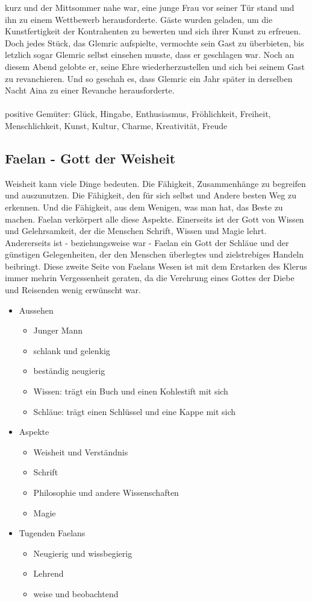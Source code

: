 kurz und der Mittsommer nahe war, eine junge Frau vor seiner Tür stand und ihn zu einem Wettbewerb herausforderte. Gäste wurden geladen, um die Kunstfertigkeit der Kontrahenten 
zu bewerten und sich ihrer Kunst zu erfreuen. Doch jedes Stück, das Glemric aufspielte, vermochte sein Gast zu überbieten, bis letzlich sogar Glemric selbst einsehen musste, 
dass er geschlagen war. Noch an diesem Abend gelobte er, seine Ehre wiederherzustellen und sich bei seinem Gast zu revanchieren. Und so geschah es, dass Glemric ein Jahr später 
in derselben Nacht Aina zu einer Revanche herausforderte. \\~\\
positive Gemüter: Glück, Hingabe, Enthusiasmus, Fröhlichkeit, Freiheit, Menschlichkeit, Kunst, Kultur, Charme, Kreativität, Freude

\subsection{\textbf{Faelan} - Gott der Weisheit}
Weisheit kann viele Dinge bedeuten. Die Fähigkeit, Zusammenhänge zu begreifen und auszunutzen. Die Fähigkeit, den für sich selbst und Andere besten Weg zu erkennen. Und die 
Fähigkeit, aus dem Wenigen, was man hat, das Beste zu machen. Faelan verkörpert alle diese Aspekte. Einerseits ist der Gott von Wissen und 
Gelehrsamkeit, der die Menschen Schrift, Wissen und Magie lehrt. Andererseits ist - beziehungsweise war - Faelan ein Gott der Schläue und 
der günstigen Gelegenheiten, der den Menschen überlegtes und zielstrebiges Handeln beibringt. Diese zweite Seite von Faelans Wesen ist mit 
dem Erstarken des Klerus immer mehrin Vergessenheit geraten, da die Verehrung eines Gottes der Diebe und Reisenden wenig erwünscht war.\\
\begin{itemize}
	\item Aussehen 
	\begin{itemize}
		\item Junger Mann 
		\item schlank und gelenkig
		\item beständig neugierig
		\item Wissen: trägt ein Buch und einen Kohlestift mit sich
		\item Schläue: trägt einen Schlüssel und eine Kappe mit sich
	\end{itemize}
	\item Aspekte
	\begin{itemize}
		\item Weisheit und Verständnis
		\item Schrift
		\item Philosophie und andere Wissenschaften
		\item Magie
	\end{itemize}
	\item Tugenden Faelans
	\begin{itemize}
		\item Neugierig und wissbegierig
		\item Lehrend
		\item weise und beobachtend
	\end{itemize}
\end{itemize}
